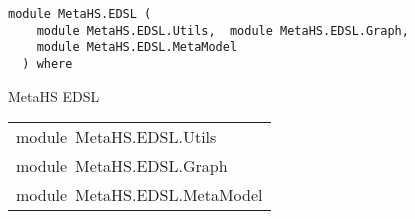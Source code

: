 \label{module:MetaHS.EDSL}
\haddockbeginheader
{\haddockverb\begin{verbatim}
module MetaHS.EDSL (
    module MetaHS.EDSL.Utils,  module MetaHS.EDSL.Graph, 
    module MetaHS.EDSL.MetaModel
  ) where\end{verbatim}}
\haddockendheader

MetaHS EDSL\par

\begin{haddockdesc}
\item[\begin{tabular}{@{}l}
module\ MetaHS.EDSL.Utils\\module\ MetaHS.EDSL.Graph\\module\ MetaHS.EDSL.MetaModel
\end{tabular}]
\end{haddockdesc}
